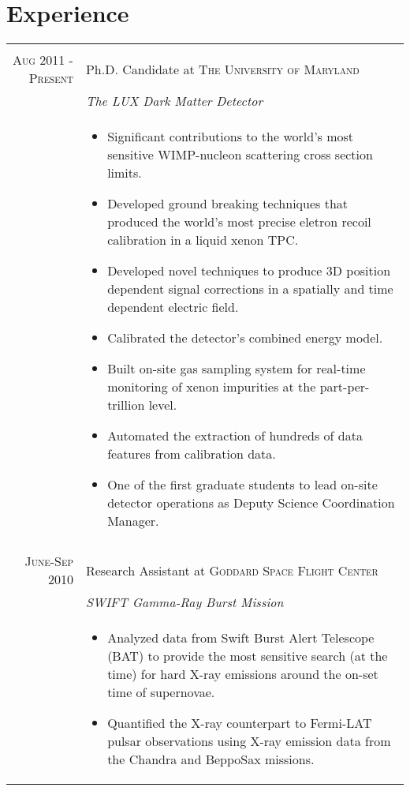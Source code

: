 \documentclass[a4paper,10pt]{article}
\begin{document}
\section{Experience}
\begin{tabular}{r|p{11cm}}
 \multicolumn{2}{c}{} \\
 \textsc{Aug 2011 - Present} & Ph.D. Candidate at \textsc{The University of Maryland} \\&\emph{The LUX Dark Matter Detector}\\&\footnotesize{
 \begin{itemize}
\item Significant contributions to the world's most sensitive WIMP-nucleon scattering cross section limits.  
 
\item  Developed ground breaking techniques that produced the world's most precise eletron recoil calibration in a liquid xenon TPC.  

\item Developed novel techniques to produce 3D position dependent signal corrections in a spatially and time dependent electric field.  

\item Calibrated the detector's combined energy model.

\item Built on-site gas sampling system for real-time monitoring of xenon impurities at the part-per-trillion level.

\item Automated the extraction of hundreds of data features from calibration data.  

\item One of the first graduate students to lead on-site detector operations as Deputy Science Coordination Manager.

\end{itemize}
}\\ 
 \multicolumn{2}{c}{} \\
 \textsc{June-Sep 2010} & Research Assistant at \textsc{Goddard Space Flight Center} \\&\emph{SWIFT Gamma-Ray Burst Mission}\\&\footnotesize{
 \begin{itemize}
\item Analyzed data from Swift Burst Alert Telescope (BAT) to provide the most sensitive search (at the time) for hard X-ray emissions around the on-set time of supernovae.
\item Quantified the X-ray counterpart to Fermi-LAT pulsar observations using X-ray emission data from the Chandra and BeppoSax missions.
\end{itemize}
 
}
\end{tabular}
\end{document}
